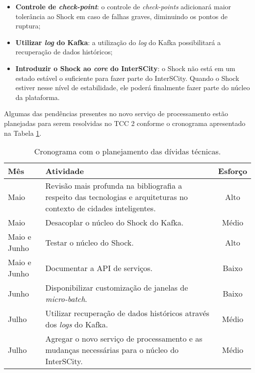 \begin{itemize}
    \item \textbf{Controle de \textit{check-point}}: o controle de
        \textit{check-points} adicionará maior tolerância ao Shock em caso
        de falhas graves, diminuindo os pontos de ruptura;

    \item \textbf{Utilizar \textit{log} do Kafka}: a utilização do \textit{log}
        do Kafka possibilitará a recuperação de dados históricos;

    \item \textbf{Introduzir o Shock ao \textit{core} do InterSCity}: o Shock
        não está em um estado estável o suficiente para fazer parte do
        InterSCity. Quando o Shock estiver nesse nível de estabilidade, ele
        poderá finalmente fazer parte do núcleo da plataforma.
\end{itemize}

Algumas das pendências presentes no novo serviço de processamento estão
planejadas para serem resolvidas no TCC 2 conforme o cronograma apresentado
na Tabela \ref{tab:cronograma}.

\begin{table}[h]
  \begin{center}
  \caption{Cronograma com o planejamento das dívidas técnicas.}
      \label{tab:cronograma}
    \begin{tabular}{|l| p{12cm}|c|}
        \hline \textbf{Mês} & \textbf{Atividade}  & \textbf{Esforço} \\

        \hline Maio & Revisão mais profunda na bibliografia a respeito das
        tecnologias e arquiteturas no contexto de cidades inteligentes. &
        Alto \\

        \hline Maio & Desacoplar o núcleo do Shock do Kafka. & Médio \\

        \hline Maio e Junho & Testar o núcleo do Shock. & Alto \\

        \hline Maio e Junho & Documentar a API de serviços. & Baixo \\

        \hline Junho & Disponibilizar customização de janelas de \textit{micro-batch}. & Baixo \\

        \hline Julho & Utilizar recuperação de dados históricos através dos
        \textit{logs} do Kafka. & Médio \\

        \hline Julho & Agregar o novo serviço de processamento e as mudanças
        necessárias para o núcleo do InterSCity. & Médio \\

      \hline
    \end{tabular}
  \end{center}
\end{table}

